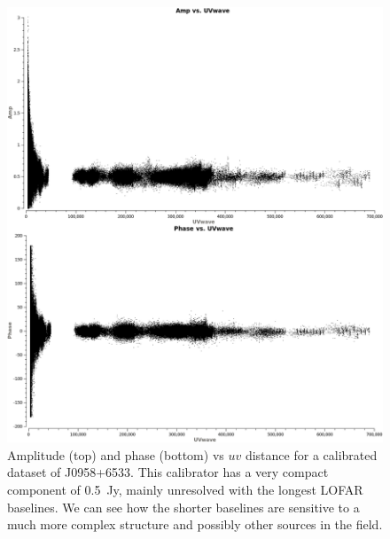 \documentclass[graybox]{svmult}
\begin{document}
\begin{figure}[htbp]
\begin{center}
\includegraphics[width=\textwidth]{figures/radplot.png}
\caption{Amplitude (top) and phase (bottom) vs $uv$ distance for a calibrated
dataset of J0958+6533. This calibrator has a very compact component of 0.5~Jy,
mainly unresolved with the longest LOFAR baselines. We can see how the shorter
baselines are sensitive to a much more complex structure and possibly other
sources in the field.}
\label{fig:radplot}
\end{center}
\end{figure}
\end{document}

